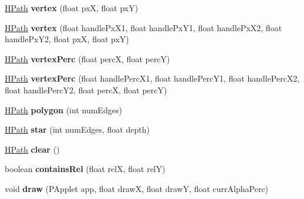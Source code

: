 \begin{DoxyCompactItemize}
\item 
\hypertarget{classhype_1_1drawable_1_1_h_path_af1af9ef7fd6c172ff05f4ebd42ef43f0}{\hyperlink{classhype_1_1drawable_1_1_h_path}{H\-Path} {\bfseries vertex} (float px\-X, float px\-Y)}\label{classhype_1_1drawable_1_1_h_path_af1af9ef7fd6c172ff05f4ebd42ef43f0}

\item 
\hypertarget{classhype_1_1drawable_1_1_h_path_aacc6d6046734ec6b64f03eaa333146c0}{\hyperlink{classhype_1_1drawable_1_1_h_path}{H\-Path} {\bfseries vertex} (float handle\-Px\-X1, float handle\-Px\-Y1, float handle\-Px\-X2, float handle\-Px\-Y2, float px\-X, float px\-Y)}\label{classhype_1_1drawable_1_1_h_path_aacc6d6046734ec6b64f03eaa333146c0}

\item 
\hypertarget{classhype_1_1drawable_1_1_h_path_ac5ea1af96c05276213cf2de7af9d7e20}{\hyperlink{classhype_1_1drawable_1_1_h_path}{H\-Path} {\bfseries vertex\-Perc} (float perc\-X, float perc\-Y)}\label{classhype_1_1drawable_1_1_h_path_ac5ea1af96c05276213cf2de7af9d7e20}

\item 
\hypertarget{classhype_1_1drawable_1_1_h_path_a478a911f3547139618369efe3dc28b5d}{\hyperlink{classhype_1_1drawable_1_1_h_path}{H\-Path} {\bfseries vertex\-Perc} (float handle\-Perc\-X1, float handle\-Perc\-Y1, float handle\-Perc\-X2, float handle\-Perc\-Y2, float perc\-X, float perc\-Y)}\label{classhype_1_1drawable_1_1_h_path_a478a911f3547139618369efe3dc28b5d}

\item 
\hypertarget{classhype_1_1drawable_1_1_h_path_afc89409cdefca947d76595601cf50ae6}{\hyperlink{classhype_1_1drawable_1_1_h_path}{H\-Path} {\bfseries polygon} (int num\-Edges)}\label{classhype_1_1drawable_1_1_h_path_afc89409cdefca947d76595601cf50ae6}

\item 
\hypertarget{classhype_1_1drawable_1_1_h_path_a80d11cfd16ae84a07aa52b7d59e301ce}{\hyperlink{classhype_1_1drawable_1_1_h_path}{H\-Path} {\bfseries star} (int num\-Edges, float depth)}\label{classhype_1_1drawable_1_1_h_path_a80d11cfd16ae84a07aa52b7d59e301ce}

\item 
\hypertarget{classhype_1_1drawable_1_1_h_path_aae95fc174db2c006e5cb7f2df99b5232}{\hyperlink{classhype_1_1drawable_1_1_h_path}{H\-Path} {\bfseries clear} ()}\label{classhype_1_1drawable_1_1_h_path_aae95fc174db2c006e5cb7f2df99b5232}

\item 
\hypertarget{classhype_1_1drawable_1_1_h_path_a2f3932e890ba712db9935def871ffc5d}{boolean {\bfseries contains\-Rel} (float rel\-X, float rel\-Y)}\label{classhype_1_1drawable_1_1_h_path_a2f3932e890ba712db9935def871ffc5d}

\item 
\hypertarget{classhype_1_1drawable_1_1_h_path_af3200ef25e78cb2ac3efadce936bc017}{void {\bfseries draw} (P\-Applet app, float draw\-X, float draw\-Y, float curr\-Alpha\-Perc)}\label{classhype_1_1drawable_1_1_h_path_af3200ef25e78cb2ac3efadce936bc017}

\end{DoxyCompactItemize}
